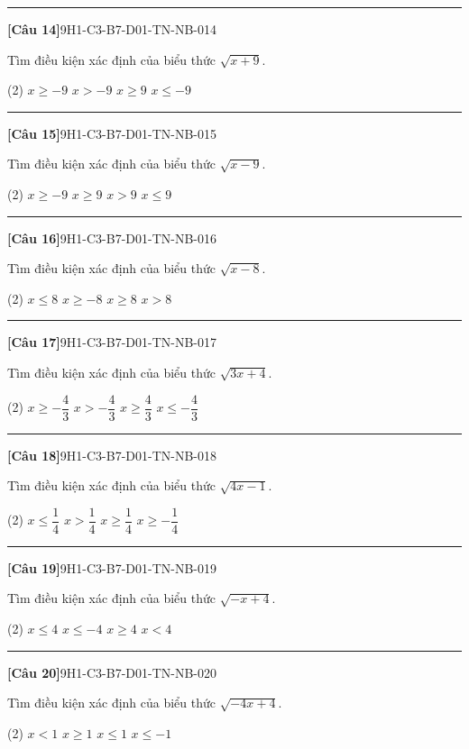 \documentclass[12pt,a4paper]{article}
\newif\ifloigiai
\newenvironment{cauhoi}[2]{%
  \par\medskip\noindent\rule{\textwidth}{0.4pt}\par\nopagebreak
  \noindent\textbf{[#1]}\hfill{\scriptsize\ttfamily #2}\par\nopagebreak\smallskip}{\par}
\newcommand{\dapan}[1]{\ifloigiai\par\smallskip\noindent\textit{Đáp án:} \textbf{#1}\par\fi}
\begin{document}
\begin{cauhoi}{Câu 14}{9H1-C3-B7-D01-TN-NB-014}
Tìm điều kiện xác định của biểu thức $\sqrt{x + 9}$.
\begin{tasks}(2)
\task $x\ge -9$
\task $x>-9$
\task $x\ge 9$
\task $x\le -9$
\end{tasks}
\dapan{A}
\end{cauhoi}
\begin{cauhoi}{Câu 15}{9H1-C3-B7-D01-TN-NB-015}
Tìm điều kiện xác định của biểu thức $\sqrt{x - 9}$.
\begin{tasks}(2)
\task $x\ge -9$
\task $x\ge 9$
\task $x>9$
\task $x\le 9$
\end{tasks}
\dapan{B}
\end{cauhoi}
\begin{cauhoi}{Câu 16}{9H1-C3-B7-D01-TN-NB-016}
Tìm điều kiện xác định của biểu thức $\sqrt{x - 8}$.
\begin{tasks}(2)
\task $x\le 8$
\task $x\ge -8$
\task $x\ge 8$
\task $x>8$
\end{tasks}
\dapan{C}
\end{cauhoi}
\begin{cauhoi}{Câu 17}{9H1-C3-B7-D01-TN-NB-017}
Tìm điều kiện xác định của biểu thức $\sqrt{3x + 4}$.
\begin{tasks}(2)
\task $x\ge -\dfrac{4}{3}$
\task $x>-\dfrac{4}{3}$
\task $x\ge \dfrac{4}{3}$
\task $x\le -\dfrac{4}{3}$
\end{tasks}
\dapan{A}
\end{cauhoi}
\begin{cauhoi}{Câu 18}{9H1-C3-B7-D01-TN-NB-018}
Tìm điều kiện xác định của biểu thức $\sqrt{4x - 1}$.
\begin{tasks}(2)
\task $x\le \dfrac{1}{4}$
\task $x>\dfrac{1}{4}$
\task $x\ge \dfrac{1}{4}$
\task $x\ge -\dfrac{1}{4}$
\end{tasks}
\dapan{C}
\end{cauhoi}
\begin{cauhoi}{Câu 19}{9H1-C3-B7-D01-TN-NB-019}
Tìm điều kiện xác định của biểu thức $\sqrt{-x + 4}$.
\begin{tasks}(2)
\task $x\le 4$
\task $x\le -4$
\task $x\ge 4$
\task $x<4$
\end{tasks}
\dapan{A}
\end{cauhoi}
\begin{cauhoi}{Câu 20}{9H1-C3-B7-D01-TN-NB-020}
Tìm điều kiện xác định của biểu thức $\sqrt{-4x + 4}$.
\begin{tasks}(2)
\task $x<1$
\task $x\ge 1$
\task $x\le 1$
\task $x\le -1$
\end{tasks}
\dapan{C}
\end{cauhoi}
\end{document}
